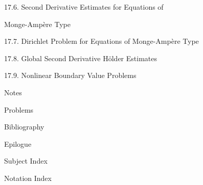 \noindent\hspace*{1.5em}17.6.  Second Derivative Estimates for Equations of
\par\noindent\hspace*{3.0em}Monge-Ampère Type 

\noindent\hspace*{1.5em}17.7.  Dirichlet Problem for Equations of Monge-Ampère Type 

\noindent\hspace*{1.5em}17.8.  Global Second Derivative Hölder Estimates 

\noindent\hspace*{1.5em}17.9.  Nonlinear Boundary Value Problems 

\noindent Notes 

\noindent Problems 

\bigskip

\noindent Bibliography 

\bigskip

\noindent Epilogue 

\bigskip

\noindent Subject Index 

\bigskip

\noindent Notation Index 
